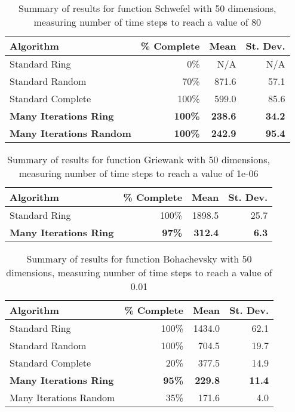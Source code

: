 \documentclass[ms,electronic,twosidetoc,letterpaper,chaptercenter,parttop,equalmargins]{byumsphd}
\begin{document}
\begin{table}
  \caption{Summary of results for function Schwefel with 50 dimensions,
  measuring number of time steps to reach a value of 80}
  \label{tab:schwefel-50}
  \centering
  \begin{tabular}{|l|r|r|r|}
  \hline
  Algorithm&\% Complete&Mean&St. Dev.\\
  \hline
  \hline
  Standard Ring&0\%&N/A&N/A\\
  \hline
  Standard Random&70\%&871.6&57.1\\
  \hline
  Standard Complete&100\%&599.0&85.6\\
  \hline
  \textbf{Many Iterations Ring}&\textbf{100\%}&\textbf{238.6}&\textbf{34.2}\\
  \hline
  \textbf{Many Iterations Random}&\textbf{100\%}&\textbf{242.9}&\textbf{95.4}\\
  \hline
  \end{tabular}
\end{table}

\begin{table}
  \caption{Summary of results for function Griewank with 50 dimensions,
  measuring number of time steps to reach a value of 1e-06}
  \label{tab:griewank-50}
  \centering
  \begin{tabular}{|l|r|r|r|}
  \hline
  Algorithm&\% Complete&Mean&St. Dev.\\
  \hline
  \hline
  Standard Ring&100\%&1898.5&25.7\\
  \hline
  \textbf{Many Iterations Ring}&\textbf{97\%}&\textbf{312.4}&\textbf{6.3}\\
  \hline
  \end{tabular}
\end{table}

\begin{table}
  \caption{Summary of results for function Bohachevsky with 50 dimensions,
  measuring number of time steps to reach a value of 0.01}
  \label{tab:bohachevsky-50}
  \centering
  \begin{tabular}{|l|r|r|r|}
  \hline
  Algorithm&\% Complete&Mean&St. Dev.\\
  \hline
  \hline
  Standard Ring&100\%&1434.0&62.1\\
  \hline
  Standard Random&100\%&704.5&19.7\\
  \hline
  Standard Complete&20\%&377.5&14.9\\
  \hline
  \textbf{Many Iterations Ring}&\textbf{95\%}&\textbf{229.8}&\textbf{11.4}\\
  \hline
  Many Iterations Random&35\%&171.6&4.0\\
  \hline
  \end{tabular}
\end{table}
\end{document}
